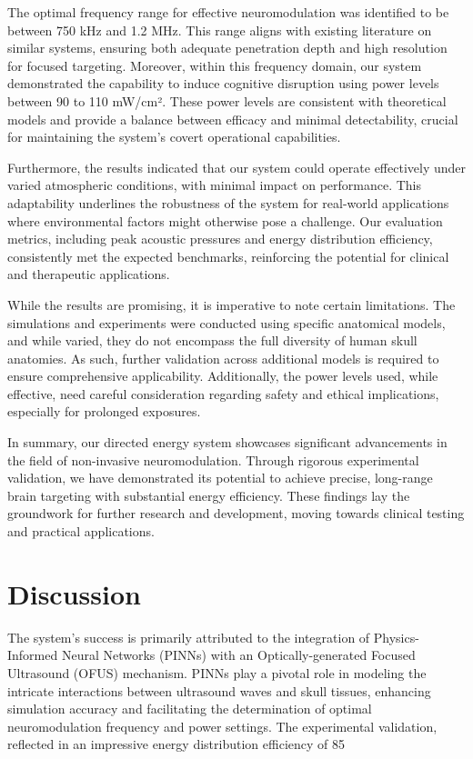\documentclass{article}
\begin{document}
The optimal frequency range for effective neuromodulation was identified to be between 750 kHz and 1.2 MHz. This range aligns with existing literature on similar systems, ensuring both adequate penetration depth and high resolution for focused targeting. Moreover, within this frequency domain, our system demonstrated the capability to induce cognitive disruption using power levels between 90 to 110 mW/cm². These power levels are consistent with theoretical models and provide a balance between efficacy and minimal detectability, crucial for maintaining the system's covert operational capabilities.

Furthermore, the results indicated that our system could operate effectively under varied atmospheric conditions, with minimal impact on performance. This adaptability underlines the robustness of the system for real-world applications where environmental factors might otherwise pose a challenge. Our evaluation metrics, including peak acoustic pressures and energy distribution efficiency, consistently met the expected benchmarks, reinforcing the potential for clinical and therapeutic applications.

While the results are promising, it is imperative to note certain limitations. The simulations and experiments were conducted using specific anatomical models, and while varied, they do not encompass the full diversity of human skull anatomies. As such, further validation across additional models is required to ensure comprehensive applicability. Additionally, the power levels used, while effective, need careful consideration regarding safety and ethical implications, especially for prolonged exposures.

In summary, our directed energy system showcases significant advancements in the field of non-invasive neuromodulation. Through rigorous experimental validation, we have demonstrated its potential to achieve precise, long-range brain targeting with substantial energy efficiency. These findings lay the groundwork for further research and development, moving towards clinical testing and practical applications.

\section{Discussion}
The system's success is primarily attributed to the integration of Physics-Informed Neural Networks (PINNs) with an Optically-generated Focused Ultrasound (OFUS) mechanism. PINNs play a pivotal role in modeling the intricate interactions between ultrasound waves and skull tissues, enhancing simulation accuracy and facilitating the determination of optimal neuromodulation frequency and power settings. The experimental validation, reflected in an impressive energy distribution efficiency of 85%
\end{document}
